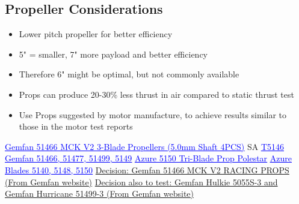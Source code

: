 	\subsection{Propeller Considerations}
		\begin{itemize}
			\item Lower pitch propeller for better efficiency
			\item 5" = smaller, 7" more payload and better efficiency
			\item Therefore 6" might be optimal, but not commonly available
			\item Props can produce 20-30\% less thrust in air compared to static thrust test
			\item Use Props suggested by motor manufacture, to achieve results similar to those in the motor test reports
		\end{itemize}
	\href{https://goblinhobbies.co.za/fpv/props/5/gemfan-51466-mck-v2-3-blade-propellers-5-0mm-shaft-4pcs.html}{\textcolor{blue}{\underline{Gemfan 51466 MCK V2 3-Blade Propellers (5.0mm Shaft 4PCS)}}} SA\newline
	\href{https://store.tmotor.com/product/t5146-fpv-propeller.html}{\textcolor{blue}{\underline{T5146}}}\newline	
	\href{https://www.gemfanhobby.com/list.aspx?cid=20}{\textcolor{blue}{\underline{Gemfan 51466, 51477, 51499, 5149}}}\newline	
	\href{https://shop.robitronic.com/en/azure-5150-tri-blade-prop-az51500303}{\textcolor{blue}{\underline{Azure 5150 Tri-Blade Prop Polestar}}}\newline	
	\href{https://azurepowerusa.com/collections/5-inch-props}{\textcolor{blue}{\underline{Azure Blades 5140, 5148, 5150}}}\newline
	\newline
	\underline{Decision: Gemfan 51466 MCK V2 RACING PROPS (From Gemfan website)}\newline
	\underline{Decision also to test: Gemfan Hulkie 5055S-3 and Gemfan Hurricane 51499-3 (From Gemfan website)}

